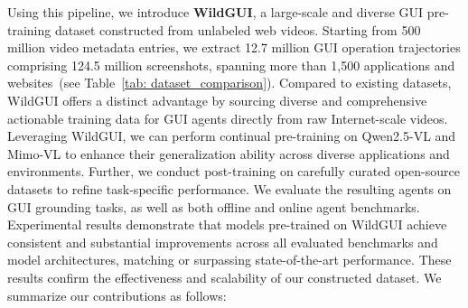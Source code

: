 \documentclass{llmxive}
\begin{document}
Using this pipeline, we introduce \textbf{WildGUI}, a large-scale and diverse GUI pre-training dataset constructed from unlabeled web videos. Starting from 500 million video metadata entries, we extract 12.7 million GUI operation trajectories comprising 124.5 million screenshots, spanning more than 1,500 applications and websites~(see Table~\ref{tab: dataset_comparison}). 
Compared to existing datasets, WildGUI offers a distinct advantage by sourcing diverse and comprehensive actionable training data for GUI agents directly from raw Internet-scale videos.
Leveraging WildGUI, we can perform continual pre-training on Qwen2.5-VL and Mimo-VL to enhance their generalization ability across diverse applications and environments. Further, we  conduct post-training on carefully curated open-source datasets to refine task-specific performance.
We evaluate the resulting agents on GUI grounding tasks, as well as both offline and online agent benchmarks. Experimental results demonstrate that models pre-trained on WildGUI achieve consistent and substantial improvements across all evaluated benchmarks and model architectures, matching or surpassing state-of-the-art performance. These results confirm the effectiveness and scalability of our constructed dataset. We summarize our contributions as follows:

\end{document}
